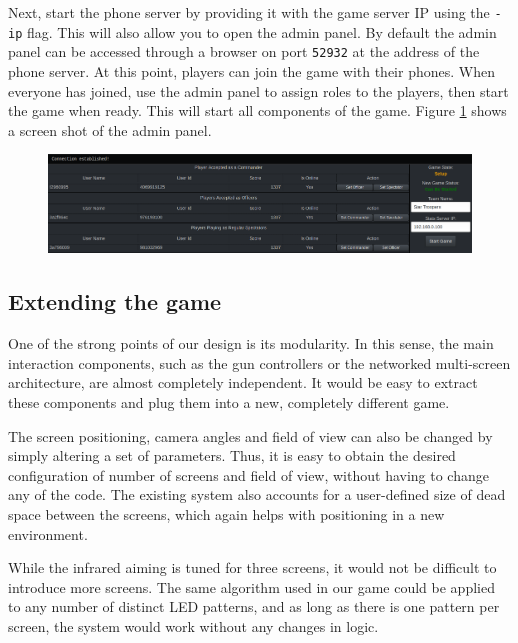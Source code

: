\documentclass[a4paper,11pt]{article}
\begin{document}
Next, start the phone server by providing it with the game server IP using the \texttt{-ip} flag. This will also allow you to open the admin panel. By default the admin panel can be accessed through a browser on port \texttt{52932} at the address of the phone server. At this point, players can join the game with their phones. When everyone has joined, use the admin panel to assign roles to the players, then start the game when ready. This will start all components of the game. Figure \ref{fig:admin_panel} shows a screen shot of the admin panel.

\begin{figure}[ht]
	\centering
	\includegraphics[width=\textwidth]{admin_panel_cropped}
    \label{fig:admin_panel}
\end{figure}

\subsection{Extending the game}
One of the strong points of our design is its modularity. In this sense, the main interaction components, such as the gun controllers or the networked multi-screen architecture, are almost completely independent. It would be easy to extract these components and plug them into a new, completely different game.

The screen positioning, camera angles and field of view can also be changed by simply altering a set of parameters. Thus, it is easy to obtain the desired configuration of number of screens and field of view, without having to change any of the code. The existing system also accounts for a user-defined size of dead space between the screens, which again helps with positioning in a new environment.

While the infrared aiming is tuned for three screens, it would not be difficult to introduce more screens. The same algorithm used in our game could be applied to any number of distinct LED patterns, and as long as there is one pattern per screen, the system would work without any changes in logic.
\end{document}

